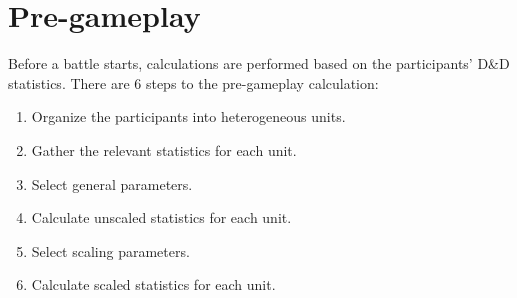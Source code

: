 \section{Pre-gameplay}\label{sec:pregame}

Before a battle starts,
calculations are performed based on the participants' D\&D statistics.
There are 6 steps to the pre-gameplay calculation:

\begin{enumerate}
    \item Organize the participants into heterogeneous units.
    \item Gather the relevant statistics for each unit.
    \item Select general parameters.
    \item Calculate unscaled statistics for each unit.
    \item Select scaling parameters.
    \item Calculate scaled statistics for each unit.
\end{enumerate}








